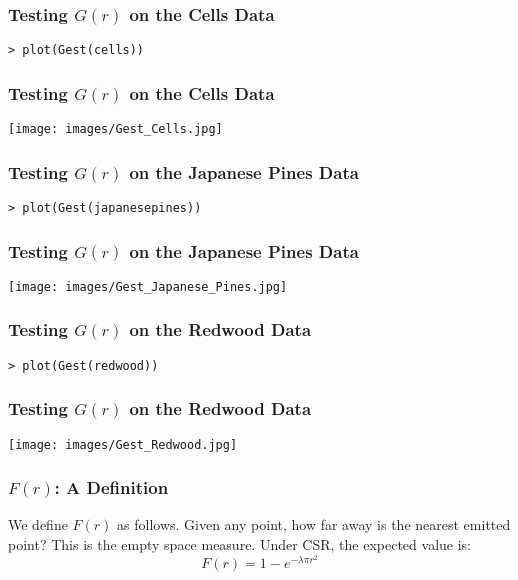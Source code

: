 \documentclass{beamer}
\begin{document}
\begin{frame}[fragile]
	\frametitle{Testing $G(r)$ on the Cells Data}

	\begin{verbatim}
> plot(Gest(cells))
	\end{verbatim}
\end{frame}

\begin{frame}[fragile]
	\frametitle{Testing $G(r)$ on the Cells Data}

	\begin{center}
		\texttt{[image: images/Gest\_Cells.jpg]}
	\end{center}
\end{frame}

\begin{frame}[fragile]
	\frametitle{Testing $G(r)$ on the Japanese Pines Data}

	\begin{verbatim}
> plot(Gest(japanesepines))
	\end{verbatim}
\end{frame}

\begin{frame}[fragile]
	\frametitle{Testing $G(r)$ on the Japanese Pines Data}

	\begin{center}
		\texttt{[image: images/Gest\_Japanese\_Pines.jpg]}
	\end{center}
\end{frame}

\begin{frame}[fragile]
	\frametitle{Testing $G(r)$ on the Redwood Data}

	\begin{verbatim}
> plot(Gest(redwood))
	\end{verbatim}
\end{frame}

\begin{frame}[fragile]
	\frametitle{Testing $G(r)$ on the Redwood Data}

	\begin{center}
		\texttt{[image: images/Gest\_Redwood.jpg]}
	\end{center}
\end{frame}

\begin{frame}[fragile]
	\frametitle{$F(r)$: A Definition}
	
	We define $F(r)$ as follows. Given any point, how far away is the nearest emitted point? This is the empty space measure. Under CSR, the expected value is:
	\[
		F(r) = 1 - e^{-\lambda \pi r^2}
	\]
\end{frame}
\end{document}
